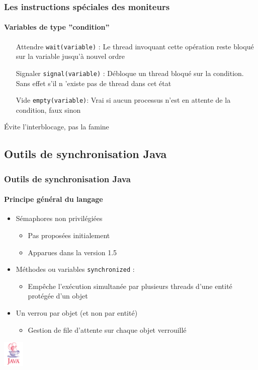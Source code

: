 \begin{frame}
\frametitle{Les instructions spéciales des moniteurs}
\framesubtitle{Variables de type ''condition''}
\begin{itemize}
\item [Attendre] \texttt{wait(variable)} : Le thread invoquant cette opération reste bloqué sur la variable jusqu’à nouvel ordre
\item [Signaler] \texttt{signal(variable)} : Débloque un thread bloqué sur la condition. Sans effet s’il n ’existe pas de thread dans cet état
\item [Vide] \texttt{empty(variable)}: Vrai si aucun processus n'est en attente de la condition, faux sinon
\end{itemize}
\end{frame}

\begin{frame}
\begin{multicols}{2}
\begin{scriptsize}\end{scriptsize}
\end{multicols}
\begin{center}
Évite l’interblocage, pas la famine
\end{center}
\end{frame}

\subsection{Outils de synchronisation Java}

\begin{frame}
\frametitle{Outils de synchronisation Java}
\framesubtitle{Principe général du langage}
\begin{itemize}
\item <1-> Sémaphores non privilégiées
\begin{itemize}
\item Pas proposées initialement
\item Apparues dans la version 1.5
\end{itemize}
\item <2-> Méthodes ou variables \texttt{synchronized} :
\begin{itemize}
\item Empêche l’exécution simultanée par plusieurs threads d’une entité protégée d’un objet
\end{itemize}
\item <3-> Un verrou par objet (et non par entité)
\begin{itemize}
\item Gestion de file d’attente sur chaque objet verrouillé
\end{itemize}
\end{itemize}
\begin{flushright}
\includegraphics[width=1cm]{../illustration/java.png}
\end{flushright}
\end{frame}

